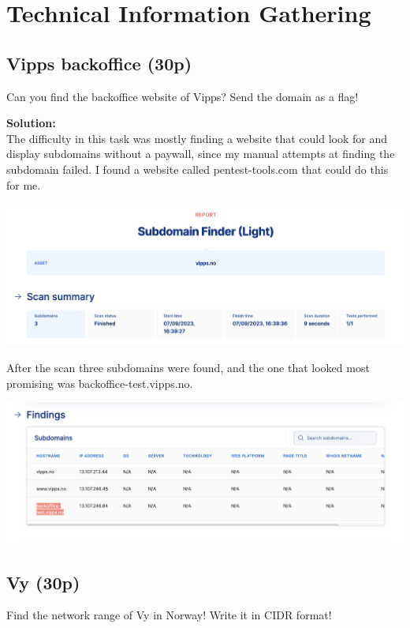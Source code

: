 \newpage
\section{Technical Information Gathering}

\subsection{Vipps backoffice (30p)}
Can you find the backoffice website of Vipps? Send the domain as a flag!

\textbf{Solution:}\\
The difficulty in this task was mostly finding a website that could look for and display subdomains without a paywall, since my manual attempts at finding the subdomain failed. I found a website called pentest-tools.com that could do this for me.

\includegraphics[width=15cm]{img/Technical information gathering/Vipps Backoffice/Skjermbilde 2023-09-07 kl. 15.40.23.png}

After the scan three subdomains were found, and the one that looked most promising was backoffice-test.vipps.no.

\includegraphics[width=15cm]{img/Technical information gathering/Vipps Backoffice/Skjermbilde 2023-09-07 kl. 15.40.13.png}

\newpage
\subsection{Vy (30p)}
Find the network range of Vy in Norway! Write it in CIDR format!

